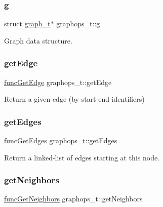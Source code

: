 \mbox{\label{structgraphops__t_ac78af00da8d2616ef3499a9632309316}} 
\subsubsection{\texorpdfstring{g}{g}}
{\footnotesize\ttfamily struct \hyperlink{structgraph__t}{graph\+\_\+t}$\ast$ graphops\+\_\+t\+::g}



Graph data structure. 

\mbox{\label{structgraphops__t_aafbe3ec7bdce040b86d7748c953cf607}} 
\subsubsection{\texorpdfstring{get\+Edge}{getEdge}}
{\footnotesize\ttfamily \hyperlink{graphops_8h_a65a97104978aff138ce01db4b7baa237}{func\+Get\+Edge} graphops\+\_\+t\+::get\+Edge}



Return a given edge (by start-\/end identifiers) 

\mbox{\label{structgraphops__t_a87fec7e1150c05e54e34ab09fe401eaa}} 
\subsubsection{\texorpdfstring{get\+Edges}{getEdges}}
{\footnotesize\ttfamily \hyperlink{graphops_8h_a1cf1c55a55049fff31b8097bfd289a62}{func\+Get\+Edges} graphops\+\_\+t\+::get\+Edges}



Return a linked-\/list of edges starting at this node. 

\mbox{\label{structgraphops__t_ac6c5bec2f102e4da5959cc3db66ac3c6}} 
\subsubsection{\texorpdfstring{get\+Neighbors}{getNeighbors}}
{\footnotesize\ttfamily \hyperlink{graphops_8h_aaa1468312d0d9fb546507a624821f412}{func\+Get\+Neighbors} graphops\+\_\+t\+::get\+Neighbors}



